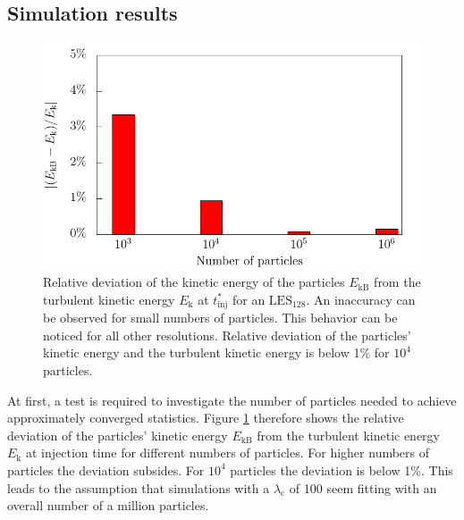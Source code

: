 \documentclass[11pt,a4paper,openany,oneside,parskip=half*]{article}
\begin{document}
\subsection{Simulation results}
\begin{figure}[h]
    \centering
    \begin{minipage}{0.5\textwidth}
        \centering
 	   \includegraphics[width=\linewidth]{./Abbildungen/kineticEnergy_numberOfParticles.pdf}
    \end{minipage}%
        \begin{minipage}{0.5\textwidth}
        \centering
        \caption{Relative deviation of the kinetic energy of the particles  $E_\mathrm{kB}$ from the turbulent kinetic energy $E_\mathrm{k}$ at $t^*_\mathrm{inj}$ for an $\mathrm{LES_{128}}$. An inaccuracy can be observed for small numbers of particles. This behavior can be noticed for all other resolutions. Relative deviation of the particles' kinetic energy and the turbulent kinetic energy is below 1\% for $10^4$ particles.}
	\label{kineticEnergy_numberofparticles}
    \end{minipage}
    \end{figure}
At first, a test is required to investigate the number of particles needed to achieve approximately converged statistics.
\newline %
Figure \ref{kineticEnergy_numberofparticles} therefore shows the relative deviation of the particles' kinetic energy $E_\mathrm{kB}$ from the turbulent kinetic energy $E_\mathrm{k}$ at injection time for different numbers of particles. For higher numbers of particles the deviation subsides. For $10^4$ particles the deviation is below 1\%.
This leads to the assumption that simulations with a $\lambda_\mathrm{c}$ of 100 seem fitting with an overall number of a million particles. 
\end{document}
